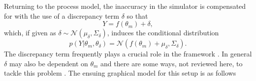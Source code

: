 \documentclass[10pt,a4paper]{article}
\newcommand{\intd} {\textrm{d}}
\begin{document}
Returning to the process model, the inaccuracy in the simulator is compensated for with the use of a discrepancy term $\delta$ so that
\begin{equation}
Y = f(\theta_{m}) + \delta,
\end{equation}
\noindent which, if given as $\delta \sim \mathcal{N}(\mu_\delta,\Sigma_\delta)$, induces the conditional distribution 
\begin{equation}
p(Y | \theta_m, \theta_\delta) = \mathcal{N}(f(\theta_m) + \mu_\delta, \Sigma_\delta).
\end{equation}
\noindent The discrepancy term frequently plays a crucial role in the framework \citep{Brynjarsdottir_2013}. In general $\delta$ may also be dependent on $\theta_m$ and there are some ways, not reviewed here, to tackle this problem \citep[e.g.][Section 7.2]{Rougier_2007}. 
The ensuing graphical model for this setup is as follows
\begin{figure}[h!]
\centering
{}
\end{figure}
\end{document}
